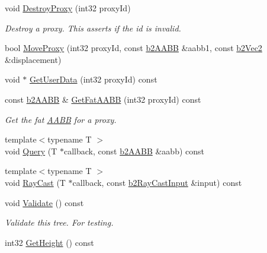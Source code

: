 \begin{DoxyCompactItemize}
\mbox{\label{classb2DynamicTree_a62aa451e7d7fe029818dd05f76ea9cdc}} 
void \hyperlink{classb2DynamicTree_a62aa451e7d7fe029818dd05f76ea9cdc}{Destroy\+Proxy} (int32 proxy\+Id)
\begin{DoxyCompactList}\small\item\em Destroy a proxy. This asserts if the id is invalid. \end{DoxyCompactList}\item 
bool \hyperlink{classb2DynamicTree_a7748252811f3c575015931399cbe4daa}{Move\+Proxy} (int32 proxy\+Id, const \hyperlink{structb2AABB}{b2\+A\+A\+BB} \&aabb1, const \hyperlink{structb2Vec2}{b2\+Vec2} \&displacement)
\item 
void $\ast$ \hyperlink{classb2DynamicTree_ac36ab1d116884966f279b8a8fb89ea19}{Get\+User\+Data} (int32 proxy\+Id) const
\item 
\mbox{\label{classb2DynamicTree_a5d329e8f63a067d13f0263bf1bcd7a56}} 
const \hyperlink{structb2AABB}{b2\+A\+A\+BB} \& \hyperlink{classb2DynamicTree_a5d329e8f63a067d13f0263bf1bcd7a56}{Get\+Fat\+A\+A\+BB} (int32 proxy\+Id) const
\begin{DoxyCompactList}\small\item\em Get the fat \hyperlink{classAABB}{A\+A\+BB} for a proxy. \end{DoxyCompactList}\item 
{\footnotesize template$<$typename T $>$ }\\void \hyperlink{classb2DynamicTree_a324df3eb65dfc22d3dcdca387737b193}{Query} (T $\ast$callback, const \hyperlink{structb2AABB}{b2\+A\+A\+BB} \&aabb) const
\item 
{\footnotesize template$<$typename T $>$ }\\void \hyperlink{classb2DynamicTree_aebd2dc6ee462e0cd0763a5f472243a13}{Ray\+Cast} (T $\ast$callback, const \hyperlink{structb2RayCastInput}{b2\+Ray\+Cast\+Input} \&input) const
\item 
\mbox{\label{classb2DynamicTree_ae9b989f0c04e38f9c940623d4e1728b9}} 
void \hyperlink{classb2DynamicTree_ae9b989f0c04e38f9c940623d4e1728b9}{Validate} () const
\begin{DoxyCompactList}\small\item\em Validate this tree. For testing. \end{DoxyCompactList}\item 
int32 \hyperlink{classb2DynamicTree_ae3c7dc771d596f1f95fd3a3d7f2f3e97}{Get\+Height} () const

\end{DoxyCompactItemize}
